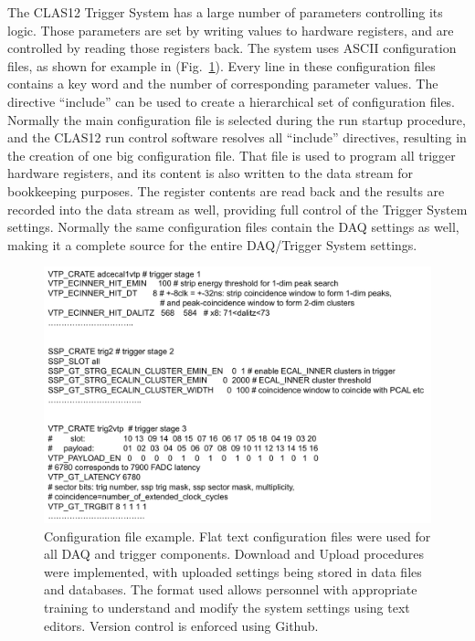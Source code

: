 The CLAS12 Trigger System has a large number of parameters controlling its logic. Those parameters are set
by writing values to hardware registers, and are controlled by reading those registers back. The system uses
ASCII configuration files, as shown for example in (Fig.~\ref{fig:config}). Every line in these configuration files
contains a key word and the number of corresponding parameter values. The directive ``include'' can be used
to create a hierarchical set of configuration files. Normally the main configuration file is selected during the
run startup procedure, and the CLAS12 run control software resolves all ``include'' directives, resulting in the
creation of one big configuration file. That file is used to program all trigger hardware registers, and its content
is also written to the data stream for bookkeeping purposes. The register contents are read back and the
results are recorded into the data stream as well, providing full control of the Trigger System settings.
Normally the same configuration files contain the DAQ settings as well, making it a complete source for the
entire DAQ/Trigger System settings.

\begin{figure}[hbt]
	\centering
	\includegraphics[width=1.0\columnwidth,keepaspectratio]{img/config.png}
	\caption{Configuration file example. Flat text configuration files were used for all DAQ and trigger
          components. Download and Upload procedures were implemented, with uploaded settings being stored
          in data files and databases. The format used allows personnel with appropriate training to understand
          and modify the system settings using text editors. Version control is enforced using Github.}
	\label{fig:config}
\end{figure}


